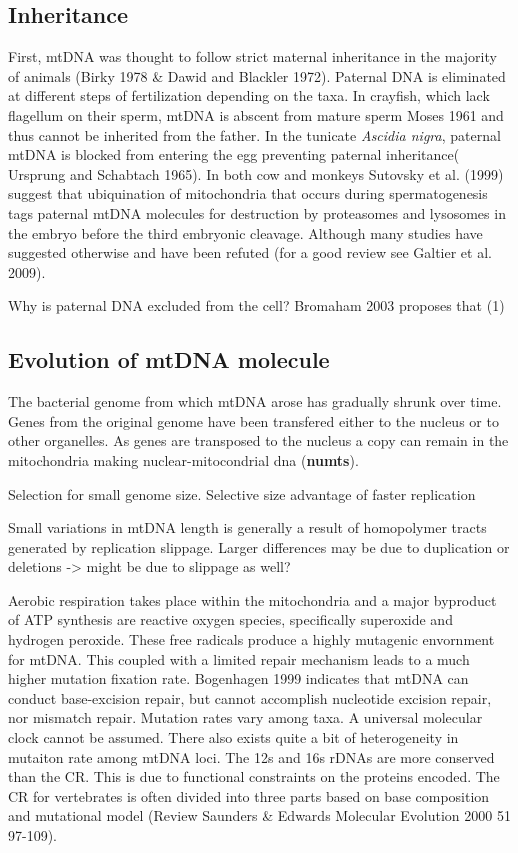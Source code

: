\documentclass{report}\usepackage[]{graphicx}\usepackage[]{color}
\begin{document}
\subsection*{Inheritance}
First, mtDNA was thought to follow strict maternal inheritance in the 
majority of animals (Birky 1978 \& Dawid and Blackler 1972). Paternal DNA is eliminated at different steps of 
fertilization depending on the taxa. In crayfish, which lack flagellum on their sperm, mtDNA is abscent from
mature sperm Moses 1961 and thus cannot be inherited from the father. In the tunicate \textit{Ascidia nigra},
paternal mtDNA is blocked from entering the egg preventing paternal 
inheritance( Ursprung and Schabtach 1965). In both cow and monkeys
Sutovsky et al. (1999) suggest that ubiquination of mitochondria that occurs during spermatogenesis tags
paternal mtDNA molecules for destruction by proteasomes and lysosomes in the embryo before the 
third embryonic cleavage. Although many studies have suggested otherwise and have been refuted (for
a good review see Galtier et al. 2009). 

Why is paternal DNA excluded from the cell? Bromaham 2003 proposes that 
(1) 


\subsection*{Evolution of mtDNA molecule}
The bacterial genome from which mtDNA arose has gradually shrunk over time. Genes from the 
original genome have been transfered either to the nucleus or to other organelles. As genes are 
transposed to the nucleus a copy can remain in the mitochondria making nuclear-mitocondrial dna 
(\textbf{numts}).  

Selection for small genome size. Selective size advantage of faster replication

Small variations in mtDNA length is generally a result of homopolymer tracts generated by replication 
slippage. Larger differences may be due to duplication or deletions -> might be due to slippage as well?

Aerobic respiration takes place within the mitochondria and a major byproduct of ATP synthesis are
reactive oxygen species, specifically superoxide and hydrogen peroxide. These free radicals produce a 
highly mutagenic envornment for mtDNA. This coupled with
a limited repair mechanism leads to a much higher mutation fixation rate. 
Bogenhagen 1999 indicates that mtDNA can conduct base-excision repair, but cannot
accomplish nucleotide excision repair, nor mismatch repair. Mutation rates vary among taxa.
A universal molecular clock cannot be assumed. There also exists quite a
bit of heterogeneity in mutaiton rate among mtDNA loci. The 12s and 16s rDNAs are more conserved
than the CR. This is due to functional constraints on the proteins encoded.
The CR for vertebrates is often divided into three parts based on base composition and mutational
model (Review Saunders \& Edwards Molecular Evolution 2000 51 97-109).  
\end{document}
